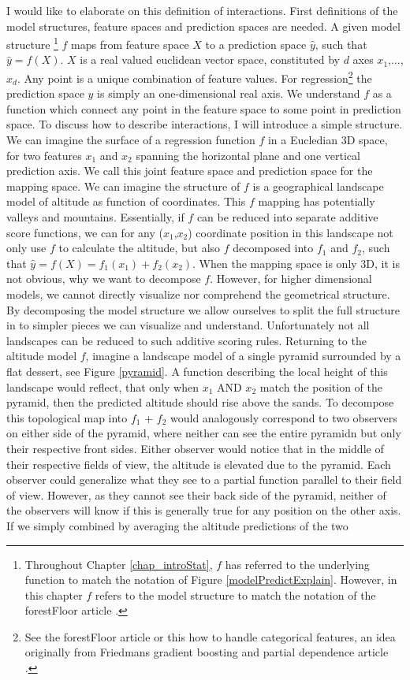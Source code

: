 I would like to elaborate on this definition of interactions. First definitions of the model structures, feature spaces and prediction spaces are needed. A given model structure
\footnote{Throughout Chapter \ref{chap_introStat}, $f$ has referred to the underlying function to match the notation of Figure \ref{modelPredictExplain}\cite{Mostafa2013learning}. However, in this chapter $f$ refers to the model structure to match the notation of the forestFloor article \cite{welling2016forest}.}
$f$ maps from feature space $X$ to a prediction space $\hat{y}$, such that $\hat{y} = f(X)$. $X$ is a real valued euclidean vector space, constituted by $d$ axes $x_1$,...,$x_d$. Any point is a unique combination of feature values.
For regression\footnote{See the forestFloor article \cite{welling2016forest} or this how to handle categorical features, an idea originally from Friedmans gradient boosting and partial dependence article \cite{friedman2001greedy}.} the prediction space $\hat{y}$ is simply an one-dimensional real axis. We understand $f$ as a function which connect any point in the feature space to some point in prediction space. To discuss how to describe interactions, I will introduce a simple structure. We can imagine the surface of a regression function $f$ in a Eucledian 3D space, for two features $x_1$ and $x_2$ spanning the horizontal plane and one vertical prediction axis. We call this joint feature space and prediction space for the mapping space. We can imagine the structure of $f$ is a geographical landscape model of altitude as function of coordinates. This $f$ mapping has potentially valleys and mountains. Essentially, if $f$ can be reduced into separate additive score functions, we can for any ($x_1$,$x_2$) coordinate position in this landscape not only use $f$ to calculate the altitude, but also $f$ decomposed into $f_1$ and $f_2$, such that $\hat{y} = f(X) = f_1(x_1) + f_2(x_2)$. When the mapping space is only 3D, it is not obvious, why we want to decompose $f$. However, for higher dimensional models, we cannot directly visualize nor comprehend the geometrical structure. By decomposing the model structure we allow ourselves to split the full structure in to simpler pieces we can visualize and understand. Unfortunately not all landscapes can be reduced to such additive scoring rules. Returning to the altitude model $f$, imagine a landscape model of a single pyramid surrounded by a flat dessert, see Figure \ref{pyramid}. A function describing the local height of this landscape would reflect, that only when $x_1$ AND $x_2$ match the position of the pyramid, then the predicted altitude should rise above the sands. To decompose this topological map into $f_1$ + $f_2$ would analogously correspond to two observers on either side of the pyramid, where neither can see the entire pyramidn but only their respective front sides. Either observer would notice that in the middle of their respective fields of view, the altitude is elevated due to the pyramid. Each observer could generalize what they see to a partial function parallel to their field of view. However, as they cannot see their back side of the pyramid, neither of the observers will know if this is generally true for any position on the other axis. If we simply combined by averaging the altitude predictions of the two 